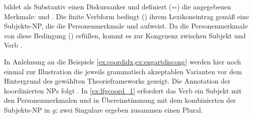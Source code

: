  bildet als Substantiv einen Diskursanker und definiert (=) die
angegebenen Merk\-male:  und
. Die finite Verbform  bedingt (\req) ihrem
Lexikoneintrag gemäß eine Subjekts-NP, die die Personenmerkmale
 und  aufweist. Da die
Personenmerkmale von  diese Bedingung () erfüllen,
kommt es zur Kongruenz zwischen Subjekt und Verb
\autocite[vgl.][59]{bresnanetal2016}.

In Anlehnung an die Beispiele \cref{ex:coordidx,ex:engartdiscong} werden hier noch einmal zur Illustration die jeweils
grammatisch akzeptablen Varianten vor dem Hintergrund des gewählten
Theorieframeworks gezeigt. Die Annotation der koordinierten NPs folgt
\citet{peterson2004}. In \cref{ex:lfgcoord_1} erfordert das Verb 
ein Subjekt mit den Personenmerkmalen  und
 in Übereinstimmung mit dem kombinierten \Index{} der
Subjekts-NP in $g$; zwei Singulare ergeben zusammen einen Plural.

